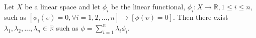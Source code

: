 \documentclass[12pt]{article}
\begin{document}
Let $X$ be a linear space and let $\phi_i$ be the linear functional, $\phi_i \colon X \to \mathbb{R} , 1\leq  i\leq n$, such as 
 $\displaystyle [\phi_i(\upsilon)=0, \forall i=1, 2 ,...,n] \rightarrow [\phi(\upsilon)=0].$
Then there exist $\lambda_1, \lambda_2, ..., \lambda_n \in \mathbb{R}$ such as $\phi=\sum_{i=1}^{n}\lambda_i\phi_i$.
\end{document}
